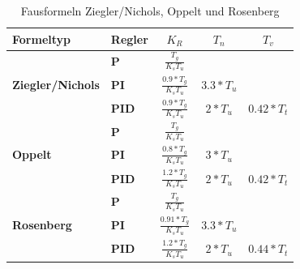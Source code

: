 \begin{table}[h]
\centering
\renewcommand*{\arraystretch}{1.7}
\begin{tabular}{|l|l|c|c|c|}
\hline 
\textbf{Formeltyp} & \textbf{Regler} & \textbf{$K_R$} & \textbf{$T_n$} & \textbf{$T_v$} \\ 
\hline 
 & \textbf{P} & $\frac{T_g}{K_sT_u}$ &  &  \\ 
\cline{2-5} 
\textbf{Ziegler/Nichols}&\textbf{PI} & $\frac{0.9*T_g}{K_sT_u}$ & $3.3*T_u$ &  \\ 
\cline{2-5} 
&\textbf{PID} & $\frac{0.9*T_g}{K_sT_u}$ & $2*T_u$ & $0.42*T_t$ \\ 
\hline 

&\textbf{P} & $\frac{T_g}{K_sT_u}$ &  &  \\ 
\cline{2-5} 
\textbf{Oppelt} &\textbf{PI} & $\frac{0.8*T_g}{K_sT_u}$ & $3*T_u$ &  \\ 
\cline{2-5} 
&\textbf{PID} & $\frac{1.2*T_g}{K_sT_u}$ & $2*T_u$ & $0.42*T_t$ \\ 
\hline 

&\textbf{P} & $\frac{T_g}{K_sT_u}$ &  &  \\ 
\cline{2-5} 
\textbf{Rosenberg} &\textbf{PI} & $\frac{0.91*T_g}{K_sT_u}$ & $3.3*T_u$ &  \\ 
\cline{2-5}  
&\textbf{PID} & $\frac{1.2*T_g}{K_sT_u}$ & $2*T_u$ & $0.44*T_t$ \\ 
\hline 

\end{tabular} 
\renewcommand*{\arraystretch}{1}
\caption{Fausformeln Ziegler/Nichols, Oppelt und Rosenberg \cite{bate}}
\end{table}

